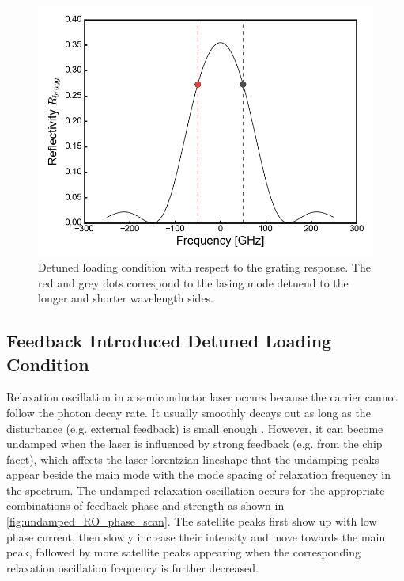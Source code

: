 \begin{figure}[ht]
    \centering
    \includegraphics[width=.7\linewidth]{figures/detuned_loading_principle.png}
    \caption{Detuned loading condition with respect to the grating response. The red and grey dots correspond to the lasing mode detuend to the longer and shorter wavelength sides.}
    \label{fig:detuned_loading_principle}
\end{figure}



\subsection{Feedback Introduced Detuned Loading Condition}\label{subsec:feedback_introduced_detuned_loading}
Relaxation oscillation in a semiconductor laser occurs because the carrier cannot follow the photon decay rate. It usually smoothly decays out as long as the disturbance (e.g. external feedback) is small enough \cite{ohtsubo2012semiconductor}. However, it can become undamped when the laser is influenced by strong feedback (e.g. from the chip facet), which affects the laser lorentzian lineshape that the undamping peaks appear beside the main mode with the mode spacing of relaxation frequency in the spectrum. The undamped relaxation oscillation occurs for the appropriate combinations of feedback phase and strength as shown in \autoref{fig:undamped_RO_phase_scan}. The satellite peaks first show up with low phase current, then slowly increase their intensity and move towards the main peak, followed by more satellite peaks appearing when the corresponding relaxation oscillation frequency is further decreased.

